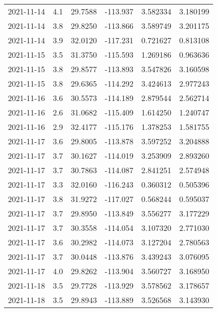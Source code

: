\begin{tabular}{lrrrrr}
2021-11-14 &       4.1 &  29.7588 &  -113.937 &         3.582334 &         3.180199 \\
2021-11-14 &       3.8 &  29.8250 &  -113.866 &         3.589749 &         3.201175 \\
2021-11-14 &       3.9 &  32.0120 &  -117.231 &         0.721627 &         0.813108 \\
2021-11-15 &       3.5 &  31.3750 &  -115.593 &         1.269186 &         0.963636 \\
2021-11-15 &       3.8 &  29.8577 &  -113.893 &         3.547826 &         3.160598 \\
2021-11-15 &       3.8 &  29.6365 &  -114.292 &         3.424613 &         2.977243 \\
2021-11-16 &       3.6 &  30.5573 &  -114.189 &         2.879544 &         2.562714 \\
2021-11-16 &       2.6 &  31.0682 &  -115.409 &         1.614250 &         1.240747 \\
2021-11-16 &       2.9 &  32.4177 &  -115.176 &         1.378253 &         1.581755 \\
2021-11-17 &       3.6 &  29.8005 &  -113.878 &         3.597252 &         3.204888 \\
2021-11-17 &       3.7 &  30.1627 &  -114.019 &         3.253909 &         2.893260 \\
2021-11-17 &       3.7 &  30.7863 &  -114.087 &         2.841251 &         2.574948 \\
2021-11-17 &       3.3 &  32.0160 &  -116.243 &         0.360312 &         0.505396 \\
2021-11-17 &       3.8 &  31.9272 &  -117.027 &         0.568244 &         0.595037 \\
2021-11-17 &       3.7 &  29.8950 &  -113.849 &         3.556277 &         3.177229 \\
2021-11-17 &       3.7 &  30.3558 &  -114.054 &         3.107320 &         2.771030 \\
2021-11-17 &       3.6 &  30.2982 &  -114.073 &         3.127204 &         2.780563 \\
2021-11-17 &       3.7 &  30.0448 &  -113.876 &         3.439243 &         3.076095 \\
2021-11-17 &       4.0 &  29.8262 &  -113.904 &         3.560727 &         3.168950 \\
2021-11-18 &       3.5 &  29.7728 &  -113.929 &         3.578562 &         3.178657 \\
2021-11-18 &       3.5 &  29.8943 &  -113.889 &         3.526568 &         3.143930 \\

\end{tabular}
